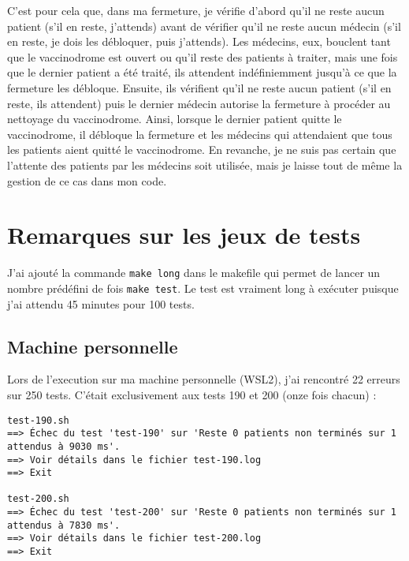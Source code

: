 \documentclass[a4paper]{article}
\begin{document}
\smallskip \newline C'est pour cela que, dans ma fermeture, je vérifie d'abord qu'il ne reste aucun patient (s'il en reste, j'attends) avant de vérifier qu'il ne reste aucun médecin (s'il en reste, je dois les débloquer, puis j'attends).
\smallskip \newline Les médecins, eux, bouclent tant que le vaccinodrome est ouvert ou qu'il reste des patients à traiter, mais une fois que le dernier patient a été traité, ils attendent indéfiniemment jusqu'à ce que la fermeture les débloque. Ensuite, ils vérifient qu'il ne reste aucun patient (s'il en reste, ils attendent) puis le dernier médecin autorise la fermeture à procéder au nettoyage du vaccinodrome. 
\smallskip \newline Ainsi, lorsque le dernier patient quitte le vaccinodrome, il débloque la fermeture et les médecins qui attendaient que tous les patients aient quitté le vaccinodrome.
\smallskip \newline En revanche, je ne suis pas certain que l'attente des patients par les médecins soit utilisée, mais je laisse tout de même la gestion de ce cas dans mon code.

\newpage 

\section{Remarques sur les jeux de tests}

J'ai ajouté la commande \texttt{make long} dans le makefile qui permet de lancer un nombre prédéfini de fois \texttt{make test}. Le test est vraiment long à exécuter puisque j'ai attendu 45 minutes pour 100 tests.

\subsection{Machine personnelle}

\bigskip Lors de l'execution sur ma machine personnelle (WSL2), j'ai rencontré 22 erreurs sur 250 tests. C'était exclusivement aux tests 190 et 200 (onze fois chacun) :
\begin{verbatim}
test-190.sh
==> Échec du test 'test-190' sur 'Reste 0 patients non terminés sur 1 attendus à 9030 ms'.
==> Voir détails dans le fichier test-190.log
==> Exit

test-200.sh
==> Échec du test 'test-200' sur 'Reste 0 patients non terminés sur 1 attendus à 7830 ms'.
==> Voir détails dans le fichier test-200.log
==> Exit
\end{verbatim}
\end{document}
